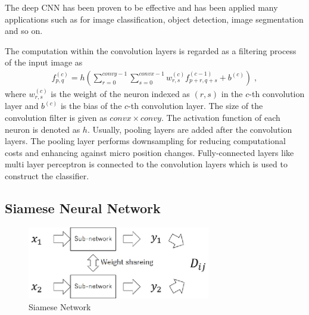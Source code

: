 \documentclass[runningheads,a4paper]{llncs}
\begin{document}
The deep CNN has been proven to be effective and has been applied many applications such as for image classification\cite{Krizhevsky2012,He2016}, object detection\cite{He2017}, image segmentation\cite{Ronneberger2015} and so on.

The computation within the convolution layers is regarded as a filtering process of the input image as
\begin{align}
f_{p,q}^{(c)}=h(\sum^{convy-1}_{r=0}\sum^{convx-1}_{s=0}w^{(c)}_{r,s}f^{(c-1)}_{p+r, q+s}+b^{(c)}) \; ,
\end{align}
where $w^{(c)}_{r,s}$ is the weight of the neuron indexed as $(r,s)$ in the $c$-th convolution layer and $b^{(c)}$ is the bias of the $c$-th convolution layer. 
The size of the convolution filter is given as $convx \times convy$. The activation function of each neuron is denoted as $h$. 
Usually, pooling layers are added after the convolution layers. The pooling layer performs downsampling for reducing computational costs and enhancing against micro position changes. 
Fully-connected layers like multi layer perceptron is connected to the convolution layers which is used to construct the classifier. 

\subsection{Siamese Neural Network}

\begin{figure}[ht]
\begin{center}
\includegraphics[width=80mm]{figure1.eps}
\caption{Siamese Network}
\label{fig:siamese}
\end{center}
\end{figure}
\end{document}
